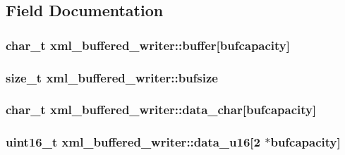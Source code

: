 \subsection{Field Documentation}
\hypertarget{classxml__buffered__writer_a84c87765fbdf444d981ffb0f67899dd4}{
\subsubsection[{buffer}]{\setlength{\rightskip}{0pt plus 5cm}char\_\-t {\bf xml\_\-buffered\_\-writer::buffer}\mbox{[}bufcapacity\mbox{]}}}
\label{classxml__buffered__writer_a84c87765fbdf444d981ffb0f67899dd4}
\hypertarget{classxml__buffered__writer_a6bad6a93035d796939d84bee30e74ce7}{
\subsubsection[{bufsize}]{\setlength{\rightskip}{0pt plus 5cm}size\_\-t {\bf xml\_\-buffered\_\-writer::bufsize}}}
\label{classxml__buffered__writer_a6bad6a93035d796939d84bee30e74ce7}
\hypertarget{classxml__buffered__writer_a6f21e839a1c66901995c8aae5cc9ad7b}{
\subsubsection[{data\_\-char}]{\setlength{\rightskip}{0pt plus 5cm}char\_\-t {\bf xml\_\-buffered\_\-writer::data\_\-char}\mbox{[}bufcapacity\mbox{]}}}
\label{classxml__buffered__writer_a6f21e839a1c66901995c8aae5cc9ad7b}
\hypertarget{classxml__buffered__writer_aa969d3724efe221a68927947e3a5196d}{
\subsubsection[{data\_\-u16}]{\setlength{\rightskip}{0pt plus 5cm}uint16\_\-t {\bf xml\_\-buffered\_\-writer::data\_\-u16}\mbox{[}2 $\ast$bufcapacity\mbox{]}}}
\label{classxml__buffered__writer_aa969d3724efe221a68927947e3a5196d}
